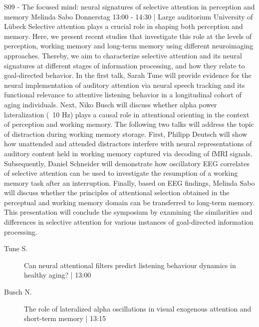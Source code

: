 
            \begin{symposium}
            {S09 - The focused mind: neural signatures of selective attention in perception and memory}
            {Melinda Sabo }
            {Donnerstag 13:00 - 14:30 | Large auditorium}
            {University of Lübeck}
            Selective attention plays a crucial role in shaping both perception and memory. Here, we present recent studies that investigate this role at the levels of perception, working memory and long-term memory using different neuroimaging approaches. Thereby, we aim to characterize selective attention and its neural signatures at different stages of information processing, and how they relate to goal-directed behavior. In the first talk, Sarah Tune will provide evidence for the neural implementation of auditory attention via neural speech tracking and its functional relevance to attentive listening behavior in a longitudinal cohort of aging individuals. Next, Niko Busch will discuss whether alpha power lateralization (~10 Hz) plays a causal role in attentional orienting in the context of perception and working memory. The following two talks will address the topic of distraction during working memory storage. First, Philipp Deutsch will show how unattended and attended distractors interfere with neural representations of auditory content held in working memory captured via decoding of fMRI signals. Subsequently, Daniel Schneider will demonstrate how oscillatory EEG correlates of selective attention can be used to investigate the resumption of a working memory task after an interruption. Finally, based on EEG findings, Melinda Sabo will discuss whether the principles of attentional selection obtained in the perceptual and working memory domain can be transferred to long-term memory. This presentation will conclude the symposium by examining the similarities and differences in selective attention for various instances of goal-directed information processing.
            \begin{description}    
            
                \item [ Tune S.] Can neural attentional filters predict listening behaviour dynamics in healthy aging? \textcolor{mygray}{ | 13:00}    
                
                \item [ Busch N.] The role of lateralized alpha oscillations in visual exogenous attention and short-term memory \textcolor{mygray}{ | 13:15}    
                

\end{description}
\end{symposium}
